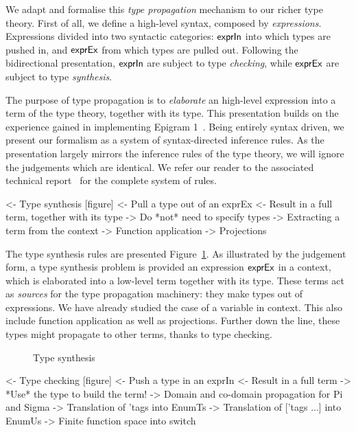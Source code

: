 We adapt and formalise this \emph{type propagation} mechanism to our
richer type theory. First of all, we define a high-level syntax,
composed by \emph{expressions}. Expressions divided into two syntactic
categories: $\textsf{exprIn}$ into which types are pushed in, and $\textsf{exprEx}$
from which types are pulled out. Following the bidirectional
presentation, $\textsf{exprIn}$ are subject to type \emph{checking}, while
$\textsf{exprEx}$ are subject to type \emph{synthesis}.


The purpose of type propagation is to \emph{elaborate} an high-level
expression into a term of the type theory, together with its
type. This presentation builds on the experience gained in
implementing Epigram 1~\cite{mcbride:view-from-the-left}. Being
entirely syntax driven, we present our formalism as a system of
syntax-directed inference rules. As the presentation largely mirrors
the inference rules of the type theory, we will ignore the judgements
which are identical. We refer our reader to the associated technical
report~\cite{chapman:desc-tech-report} for the complete system of
rules.

\begin{wstructure}
<- Type synthesis [figure]
    <- Pull a type out of an exprEx
    <- Result in a full term, together with its type
    -> Do *not* need to specify types
        -> Extracting a term from the context
        -> Function application
        -> Projections
\end{wstructure}

The type synthesis rules are presented
Figure~\ref{fig:type-synthesis}. As illustrated by the judgement form,
a type synthesis problem is provided an expression $\textsf{exprEx}$ in a
context, which is elaborated into a low-level term together with its
type. These terms act as \emph{sources} for the type propagation
machinery: they make types out of expressions. We have already studied
the case of a variable in context. This also include function
application as well as projections. Further down the line, these types
might propagate to other terms, thanks to type checking.

\begin{figure}

\caption{Type synthesis}
\label{fig:type-synthesis}
\end{figure}



\begin{wstructure}
<- Type checking [figure]
    <- Push a type in an exprIn
    <- Result in a full term
    -> *Use* the type to build the term!
        -> Domain and co-domain propagation for Pi and Sigma
        -> Translation of 'tags into EnumTs
        -> Translation of ['tags ...] into EnumUs
        -> Finite function space into switch
\end{wstructure}

